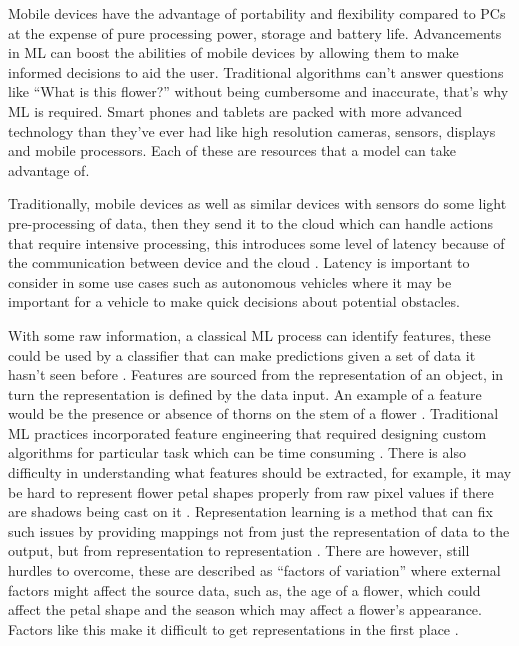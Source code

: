 \documentclass[12pt,a4paper]{report}
\begin{document}
\par

Mobile devices have the advantage of portability and flexibility compared to PCs at the expense of pure processing 
power, storage and battery life. Advancements in ML can boost the abilities of mobile devices by allowing 
them to make informed decisions to aid the user. Traditional algorithms can't answer questions
like “What is this flower?”
without being cumbersome and inaccurate, that's why ML is required.
Smart phones and tablets are packed with more advanced technology than they've ever had like high resolution 
cameras, sensors, displays and mobile processors. Each of these are resources that a model can take advantage of.

\par

Traditionally, mobile devices as well as similar devices with sensors do some light pre-processing of data, then they 
send it to the cloud which can handle actions that require intensive processing, this introduces some level of latency 
because of the communication between device and the cloud \citep[p. 3]{olascoaga2021hardware}. 
Latency is important to consider in some use cases such as autonomous vehicles \citep[pp. 3-4]{olascoaga2021hardware} 
where it may be important for a vehicle to make quick decisions about potential obstacles.

\par

With some raw information, a classical ML process can identify features, these could be used by a 
classifier that can make predictions given a set of data it hasn't seen before \citep{lecun2015deep}. Features are 
sourced from the representation of an object, in turn the representation is defined by the 
data input. An example of a feature would be the presence or absence of thorns on the stem of a flower 
\citep[p. 22]{goodfellow2016deep}. Traditional ML practices incorporated 
feature engineering that required designing custom algorithms for particular task which can be time consuming 
\citep{liu2020representation}. There is also difficulty in understanding what features should be extracted, 
for example, it may be hard to represent flower petal shapes properly from raw pixel values if there are shadows being 
cast on it \citep[p. 23]{goodfellow2016deep}. Representation learning is a method that 
can fix such issues by providing mappings not from just the representation of data to the output, but from 
representation to representation \citep[p. 24]{goodfellow2016deep}. There are however, 
still hurdles to overcome, these are described as “factors of variation” where external factors might affect the source 
data, such as, the age of a flower, which could affect the petal shape and the season which may affect a flower's 
appearance. Factors like this make it difficult to get representations in the first place 
\citep[p. 24]{goodfellow2016deep}.
\end{document}
